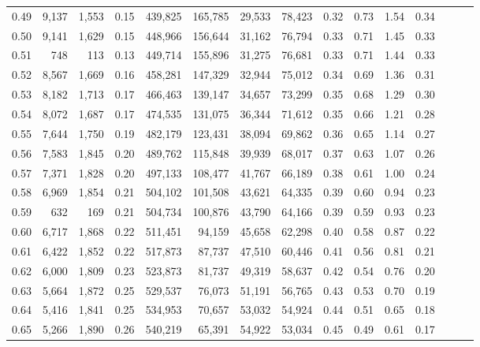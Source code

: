 \begin{tabular}{rrrrrrrrrrrrrrr}
0.49 &   9,137 &  1,553 &  0.15 &  439,825 &  165,785 &   29,533 &   78,423 &  0.32 &  0.73 &  1.54 &      0.34 \\
0.50 &   9,141 &  1,629 &  0.15 &  448,966 &  156,644 &   31,162 &   76,794 &  0.33 &  0.71 &  1.45 &      0.33 \\
0.51 &     748 &    113 &  0.13 &  449,714 &  155,896 &   31,275 &   76,681 &  0.33 &  0.71 &  1.44 &      0.33 \\
0.52 &   8,567 &  1,669 &  0.16 &  458,281 &  147,329 &   32,944 &   75,012 &  0.34 &  0.69 &  1.36 &      0.31 \\
0.53 &   8,182 &  1,713 &  0.17 &  466,463 &  139,147 &   34,657 &   73,299 &  0.35 &  0.68 &  1.29 &      0.30 \\
0.54 &   8,072 &  1,687 &  0.17 &  474,535 &  131,075 &   36,344 &   71,612 &  0.35 &  0.66 &  1.21 &      0.28 \\
0.55 &   7,644 &  1,750 &  0.19 &  482,179 &  123,431 &   38,094 &   69,862 &  0.36 &  0.65 &  1.14 &      0.27 \\
0.56 &   7,583 &  1,845 &  0.20 &  489,762 &  115,848 &   39,939 &   68,017 &  0.37 &  0.63 &  1.07 &      0.26 \\
0.57 &   7,371 &  1,828 &  0.20 &  497,133 &  108,477 &   41,767 &   66,189 &  0.38 &  0.61 &  1.00 &      0.24 \\
0.58 &   6,969 &  1,854 &  0.21 &  504,102 &  101,508 &   43,621 &   64,335 &  0.39 &  0.60 &  0.94 &      0.23 \\
0.59 &     632 &    169 &  0.21 &  504,734 &  100,876 &   43,790 &   64,166 &  0.39 &  0.59 &  0.93 &      0.23 \\
0.60 &   6,717 &  1,868 &  0.22 &  511,451 &   94,159 &   45,658 &   62,298 &  0.40 &  0.58 &  0.87 &      0.22 \\
0.61 &   6,422 &  1,852 &  0.22 &  517,873 &   87,737 &   47,510 &   60,446 &  0.41 &  0.56 &  0.81 &      0.21 \\
0.62 &   6,000 &  1,809 &  0.23 &  523,873 &   81,737 &   49,319 &   58,637 &  0.42 &  0.54 &  0.76 &      0.20 \\
0.63 &   5,664 &  1,872 &  0.25 &  529,537 &   76,073 &   51,191 &   56,765 &  0.43 &  0.53 &  0.70 &      0.19 \\
0.64 &   5,416 &  1,841 &  0.25 &  534,953 &   70,657 &   53,032 &   54,924 &  0.44 &  0.51 &  0.65 &      0.18 \\
0.65 &   5,266 &  1,890 &  0.26 &  540,219 &   65,391 &   54,922 &   53,034 &  0.45 &  0.49 &  0.61 &      0.17 \\

\end{tabular}
